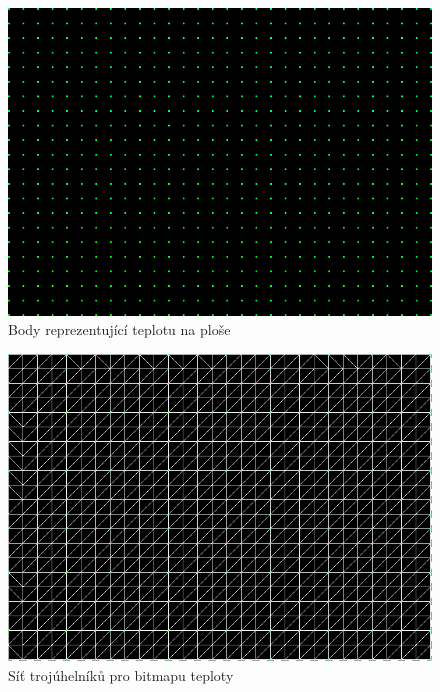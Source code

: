\documentclass[czech,bachelor,dept460,male,csharp,cpdeclaration]{diploma}
\begin{document}
	\begin{figure}
		\centering
		\includegraphics[scale=0.5]{Data/bmp_body.png}
		\caption{Body reprezentující teplotu na ploše}
	\end{figure}
	
	\begin{figure}
		\centering
		\includegraphics[scale=0.5]{Data/bmp_sit.png}
		\caption{Síť trojúhelníků pro bitmapu teploty}
	\end{figure}
	
\end{document}
